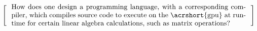 \[
  \left[
  \begin{minipage}{\textwidth}
  \centering
  \begin{minipage}{0.96\textwidth}
  How does one design a programming language, with a corresponding compiler, which compiles source code to execute on the \acrshort{gpu} at runtime for certain linear algebra calculations, such as matrix operations?
  
  



  \end{minipage}
  \end{minipage}
    \right]
\]